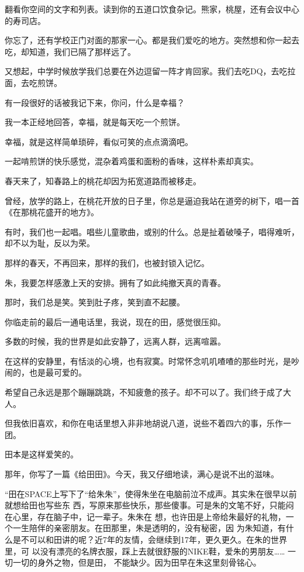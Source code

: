 		翻看你空间的文字和列表。读到你的五道口饮食杂记。熊家，桃屋，还有会议中心的寿司店。\par
		你忘了，还有学校正门对面的那家一心。都是我们爱吃的地方。突然想和你一起去吃，却知道，我们已隔了那样远了。\par
		又想起，中学时候放学我们总要在外边逗留一阵才肯回家。我们去吃DQ，去吃拉面，去吃煎饼。\par
		有一段很好的话被我记下来，你问，什么是幸福？\par
		我一本正经地回答，幸福，就是每天吃一个煎饼。\par
		幸福，就是这样简单琐碎，看似可笑的点点滴滴吧。\par
		一起啃煎饼的快乐感觉，混杂着鸡蛋和面粉的香味，这样朴素却真实。\par
		春天来了，知春路上的桃花却因为拓宽道路而被移走。\par
		曾经，放学的路上，在桃花开放的日子里，你总是逼迫我站在道旁的树下，唱一首《在那桃花盛开的地方》。\par
		有时，我们也一起唱。唱些儿童歌曲，或别的什么。总是扯着破嗓子，唱得难听，却不以为耻，反以为荣。\par
		那样的春天，不再回来，那样的我们，也被封锁入记忆。\par
		朱，我要怎样感激上天的安排。拥有了如此纯撤天真的青春。\par
		那时，我们总是笑。笑到肚子疼，笑到直不起腰。\par
		你临走前的最后一通电话里，我说，现在的田，感觉很压抑。\par
		多数的时候，我的世界是如此安静了，远离人群，远离喧嚣。\par
		在这样的安静里，有恬淡的心境，也有寂寞。时常怀念叽叽喳喳的那些时光，是吵闹的，也是最可爱的。\par
		希望自己永远是那个蹦蹦跳跳，不知疲惫的孩子。却不可以了。我们终于成了大人。\par
		但我依旧喜欢，和你在电话里想入非非地胡说八道，说些不着四六的事，乐作一团。\par
		田本是这样爱笑的。

		那年，你写了一篇《给田田》。今天，我又仔细地读，满心是说不出的滋味。

		“田在SPACE上写下了“给朱朱”，使得朱坐在电脑前泣不成声。其实朱在很早以前就想给田也写些东
	西，写原来那些快乐，那些傻事。可是朱的文笔不好，只能闷在心里，存在脑子中，记一辈子。朱朱在
	想，也许田是上帝给朱最好的礼物，一个一生陪伴的亲密朋友。在田那里，朱是透明的，没有秘密，因
	为朱知道，有什么是不可以和田讲的呢？近7年的友情，会继续到17年，更久更久。在朱的世界里，可
	以没有漂亮的名牌衣服，踩上去就很舒服的NIKE鞋，爱朱的男朋友…… 一切一切的身外之物，但是田，
	不能缺少。因为田早在朱这里刻骨铭心。

